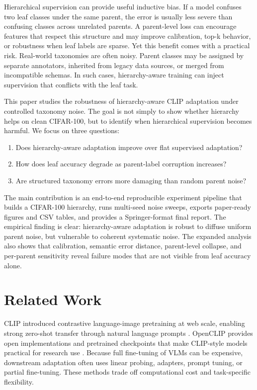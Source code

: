 \documentclass[runningheads]{llncs}
\begin{document}
Hierarchical supervision can provide useful inductive bias. If a model
confuses two leaf classes under the same parent, the error is usually less
severe than confusing classes across unrelated parents. A parent-level loss can
encourage features that respect this structure and may improve calibration,
top-k behavior, or robustness when leaf labels are sparse. Yet this benefit
comes with a practical risk. Real-world taxonomies are often noisy. Parent
classes may be assigned by separate annotators, inherited from legacy data
sources, or merged from incompatible schemas. In such cases, hierarchy-aware
training can inject supervision that conflicts with the leaf task.

This paper studies the robustness of hierarchy-aware CLIP adaptation under
controlled taxonomy noise. The goal is not simply to show whether hierarchy
helps on clean CIFAR-100, but to identify when hierarchical supervision becomes
harmful. We focus on three questions:
\begin{enumerate}
\item Does hierarchy-aware adaptation improve over flat supervised adaptation?
\item How does leaf accuracy degrade as parent-label corruption increases?
\item Are structured taxonomy errors more damaging than random parent noise?
\end{enumerate}

The main contribution is an end-to-end reproducible experiment pipeline that
builds a CIFAR-100 hierarchy, runs multi-seed noise sweeps, exports paper-ready
figures and CSV tables, and provides a Springer-format final report. The
empirical finding is clear: hierarchy-aware adaptation is robust to diffuse
uniform parent noise, but vulnerable to coherent systematic noise. The
expanded analysis also shows that calibration, semantic error distance,
parent-level collapse, and per-parent sensitivity reveal failure modes that are
not visible from leaf accuracy alone.

\section{Related Work}
CLIP introduced contrastive language-image pretraining at web scale, enabling
strong zero-shot transfer through natural language prompts \cite{radford2021clip}.
OpenCLIP provides open implementations and pretrained checkpoints that make
CLIP-style models practical for research use \cite{ilharco2021openclip}.
Because full fine-tuning of VLMs can be expensive, downstream adaptation often
uses linear probing, adapters, prompt tuning, or partial fine-tuning. These
methods trade off computational cost and task-specific flexibility.
\end{document}
